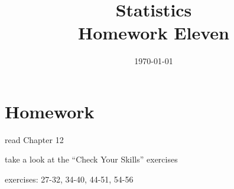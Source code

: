 \documentclass[letterpaper]{exam}
\title{Statistics \\ Homework Eleven}
\date{\today}
\author{}
\begin{document}
  \maketitle

  \section{Homework}
  \ifprintanswers
  \else
    \begin{itemize*}
      \item read Chapter 12 
      \item take a look at the ``Check Your Skills'' exercises
      \item exercises: 27-32, 34-40, 44-51, 54-56
    \end{itemize*}
  \fi

  \ifprintanswers
\end{document}
